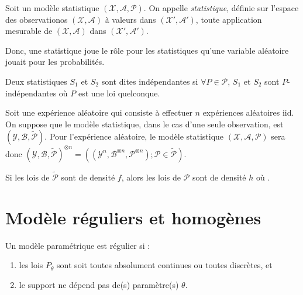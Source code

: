 \documentclass[10pt, french]{report}
\begin{document}
\begin{multicols*}{2}
\begin{definitionNOHFILL}[Statistique]
Soit un modèle statistique $(\mathcal{X}, \mathcal{A}, \mathcal{P})$. On appelle \textit{\textit{statistique}}, définie sur l'espace des observationos $(\mathcal{X}, \mathcal{A})$ à valeurs dans $(\mathcal{X}', \mathcal{A}')$, toute application mesurable  de $(\mathcal{X}, \mathcal{A})$ dans $(\mathcal{X}', \mathcal{A}')$.

\bigskip

Donc, une statistique joue le rôle pour les statistiques qu'une variable aléatoire jouait pour les probabilités.
\end{definitionNOHFILL}

\begin{definitionNOHFILLsub}[Indépendance]
Deux statistiques $S_{1}$ et $S_{2}$ sont dites indépendantes si $\forall P \in \mathcal{P}$, $S_{1}$ et $S_{2}$ sont $P$-indépendantes où $P$ est une loi quelconque.
\end{definitionNOHFILLsub}


\begin{definitionNOHFILL}
Soit une expérience aléatoire qui consiste à effectuer $n$ expériences aléatoires iid. On suppose que le modèle statistique, dans le cas d'une seule observation, est $\left(\mathcal{Y}, \mathcal{B}, \tilde{\mathcal{P}}\right)$. Pour l'expérience aléatoire, le modèle statistique $(\mathcal{X}, \mathcal{A}, \mathcal{P})$ sera donc $\left(\mathcal{Y}, \mathcal{B}, \tilde{\mathcal{P}}\right)^{\otimes n} = \left(\left(\mathcal{Y}^{n}, \mathcal{B}^{\otimes n}, \mathcal{P}^{\otimes n}\right); \mathcal{P} \in \tilde{\mathcal{P}}\right)$.

\bigskip

Si les lois de $\tilde{\mathcal{P}}$ sont de densité $f$, alors les lois de $\mathcal{P}$ sont de densité $h$ où .
\end{definitionNOHFILL}



\columnbreak
\section{Modèle réguliers et homogènes}
\begin{definitionNOHFILL}
Un modèle paramétrique est régulier si :
\begin{enumerate}
	\item	les lois $P_{\theta}$ sont soit toutes absolument continues ou toutes discrètes, et
	\item	le support ne dépend pas de(s) paramètre(s) $\theta$. 
\end{enumerate}


\end{definitionNOHFILL}
\end{multicols*}
\end{document}
